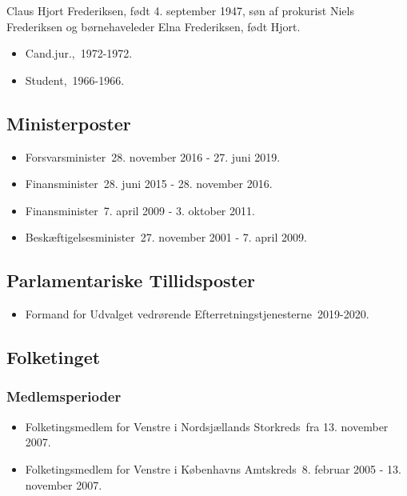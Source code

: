\documentclass[11pt, a4paper]{awesome-cv}
\begin{document}
\makecvheader[R]
\makelettertitle
\begin{cvletter}
Claus Hjort Frederiksen, født 4. september 1947, søn af prokurist Niels Frederiksen og børnehaveleder Elna Frederiksen, født Hjort.

\begin{itemize}
\item Cand.jur., 1972-1972.
\item Student, 1966-1966.
\end{itemize}
\subsection*{Ministerposter}
\begin{itemize}
\item Forsvarsminister 28. november 2016 - 27. juni 2019.
\item Finansminister 28. juni 2015 - 28. november 2016.
\item Finansminister 7. april 2009 - 3. oktober 2011.
\item Beskæftigelsesminister 27. november 2001 - 7. april 2009.
\end{itemize}
\subsection*{Parlamentariske Tillidsposter}
\begin{itemize}
\item Formand for Udvalget vedrørende Efterretningstjenesterne 2019-2020.
\end{itemize}
\subsection*{Folketinget}
\subsubsection*{Medlemsperioder}
\begin{itemize}
\item Folketingsmedlem for Venstre i Nordsjællands Storkreds fra 13. november 2007.
\item Folketingsmedlem for Venstre i Københavns Amtskreds 8. februar 2005 - 13. november 2007.
\end{itemize}

\end{cvletter}
\end{document}
